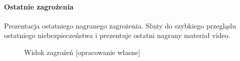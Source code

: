 \paragraph{Ostatnie zagrożenia}
Prezentacja ostatniego nagranego zagrożenia. Służy do szybkiego przeglądu ostatniego niebezpieczeństwa i prezentuje ostatni nagrany materiał video.
\nopagebreak
\begin{figure}[H]
    \centering
    \hfill
    \hfill
	\caption{Widok zagrożeń [opracowanie własne]}
    \label{fig:zagrozenia}
\end{figure}
\pagebreak

